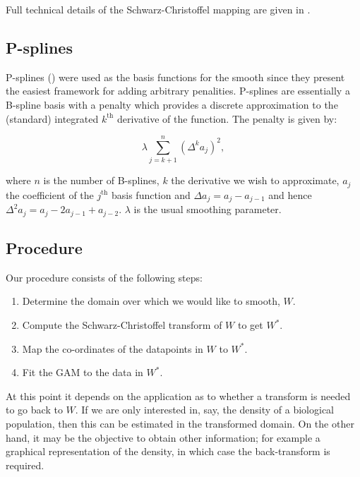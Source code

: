 \documentclass[a4paper,10pt]{amsart}
\newcommand{\sch}{Schwarz-Christoffel }
\begin{document}
Full technical details of the \sch mapping are given in \cite{miller08}.


\subsection{P-splines}
P-splines (\cite{eilersmarx96}) were used as the basis functions for the smooth since they present the easiest framework for adding arbitrary penalities. P-splines are essentially a B-spline basis with a penalty which provides a discrete approximation to the (standard) integrated $k^\text{th}$ derivative of the function. The penalty is given by:

\begin{equation*}
\lambda \sum_{j=k+1}^n (\Delta^k a_j)^2,
\end{equation*}

where $n$ is the number of B-splines, $k$ the derivative we wish to approximate, $a_j$ the coefficient of the $j^\text{th}$ basis function and $\Delta a_j = a_j-a_{j-1}$ and hence $\Delta^2 a_j = a_j-2a_{j-1}+a_{j-2}$. $\lambda$ is the usual smoothing parameter. 

\subsection{Procedure}

Our procedure consists of the following steps:

\begin{enumerate}
\item Determine the domain over which we would like to smooth, $W$.

\item Compute the \sch transform of $W$ to get $W^*$.

\item Map the co-ordinates of the datapoints in $W$ to $W^*$.

\item Fit the GAM to the data in $W^*$.

\end{enumerate}

At this point it depends on the application as to whether a transform is needed to go back to $W$. If we are only interested in, say, the density of a biological population, then this can be estimated in the transformed domain. On the other hand, it may be the objective to obtain other information; for example a graphical representation of the density, in which case the back-transform is required.
\end{document}
